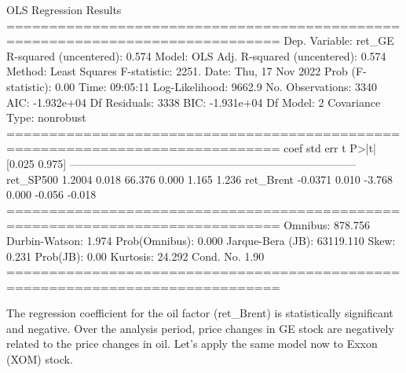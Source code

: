 \begin{ioutput}
OLS Regression Results                                
==============================================================================
Dep. Variable:                 ret_GE   R-squared (uncentered):          0.574
Model:                            OLS   Adj. R-squared (uncentered):     0.574
Method:                 Least Squares   F-statistic:                     2251.
Date:                Thu, 17 Nov 2022   Prob (F-statistic):               0.00
Time:                        09:05:11   Log-Likelihood:                 9662.9
No. Observations:                3340   AIC:                        -1.932e+04
Df Residuals:                    3338   BIC:                        -1.931e+04
Df Model:                           2                                                  
Covariance Type:            nonrobust                                                  
==============================================================================
coef          std err          t      P>|t|      [0.025      0.975]
------------------------------------------------------------------------------
ret_SP500      1.2004      0.018     66.376      0.000       1.165       1.236
ret_Brent     -0.0371      0.010     -3.768      0.000      -0.056      -0.018
==============================================================================
Omnibus:                      878.756   Durbin-Watson:                   1.974
Prob(Omnibus):                  0.000   Jarque-Bera (JB):            63119.110
Skew:                           0.231   Prob(JB):                         0.00
Kurtosis:                      24.292   Cond. No.                         1.90
==============================================================================
\end{ioutput}

The regression coefficient for the oil factor (ret\_Brent) is statistically significant and negative. Over the analysis period, price changes in GE stock are negatively related to the price changes in oil.
Let's apply the same model now to Exxon (XOM) stock.

